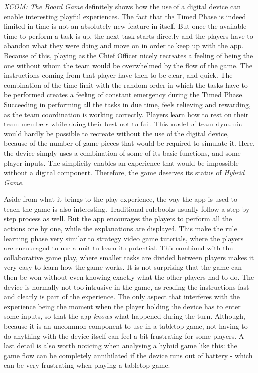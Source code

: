 \textit{XCOM: The Board Game} definitely shows how the use of a digital device can enable interesting playful experiences. The fact that the Timed Phase is indeed limited in time is not an absolutely new feature in itself. But once the available time to perform a task is up, the next task starts directly and the players have to abandon what they were doing and move on in order to keep up with the app. Because of this, playing as the Chief Officer nicely recreates a feeling of being the one without whom the team would be overwhelmed by the flow of the game. The instructions coming from that player have then to be clear, and quick. The combination of the time limit with the random order in which the tasks have to be performed creates a feeling of constant emergency during the Timed Phase. Succeeding in performing all the tasks in due time, feels relieving and rewarding, as the team coordination is working correctly. Players learn how to rest on their team members while doing their best not to fail. This model of team dynamic would hardly be possible to recreate without the use of the digital device, because of the number of game pieces that would be required to simulate it. Here, the device simply uses a combination of some of its basic functions, and some player inputs. The simplicity enables an experience that would be impossible without a digital component. Therefore, the game deserves its status of \textit{Hybrid Game}.

Aside from what it brings to the play experience, the way the app is used to teach the game is also interesting. Traditional rulebooks usually follow a step-by-step process as well. But the app encourages the players to perform all the actions one by one, while the explanations are displayed. This make the rule learning phase very similar to strategy video game tutorials, where the players are encouraged to use a unit to learn its potential. This combined with the collaborative game play, where smaller tasks are divided between players makes it very easy to learn how the game works. It is not surprising that the game can then be won without even knowing exactly what the other players had to do.
The device is normally not too intrusive in the game, as reading the instructions fast and clearly is part of the experience. The only aspect that interferes with the experience being the moment when the player holding the device has to enter some inputs, so that the app \textit{knows} what happened during the turn. Although, because it is an uncommon component to use in a tabletop game, not having to do anything with the device itself can feel a bit frustrating for some players. A last detail is also worth noticing when analysing a hybrid game like this: the game flow can be completely annihilated if the device runs out of battery - which can be very frustrating when playing a tabletop game. 

